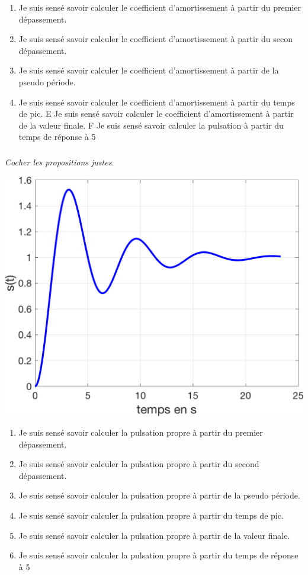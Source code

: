 \documentclass[10pt,fleqn]{article} %
\begin{document}
\begin{multicols}{2}
\begin{enumerate}
\item Je suis sensé savoir calculer le coefficient d'amortissement à partir du
premier dépassement.
\item Je suis sensé savoir calculer le coefficient d'amortissement à partir du
secon dépassement.
\item Je suis sensé savoir calculer le coefficient d'amortissement à partir de la pseudo période.
\item Je suis sensé savoir calculer le coefficient d'amortissement à partir du temps de pic.
E Je suis sensé savoir calculer le coefficient d'amortissement à partir de la valeur finale.
F Je suis sensé savoir calculer la pulsation à partir du temps de réponse à 5%
\end{enumerate}


\subparagraph{}\textit{Cocher les propositions justes.}

\begin{center}
\includegraphics[width=.65\linewidth]{images/fig_01}
\end{center}

\begin{enumerate}
\item Je suis sensé savoir calculer la pulsation propre à partir du premier
dépassement.
\item Je suis sensé savoir calculer la pulsation propre à partir du second
dépassement.
\item Je suis sensé savoir calculer la pulsation propre à partir de la pseudo
période.
\item Je suis sensé savoir calculer la pulsation propre à partir du temps de pic.
\item Je suis sensé savoir calculer la pulsation propre à partir de la valeur finale.
\item Je suis sensé savoir calculer la pulsation propre à partir du temps de réponse à 5%
\end{enumerate}




\end{multicols}
\end{document}
